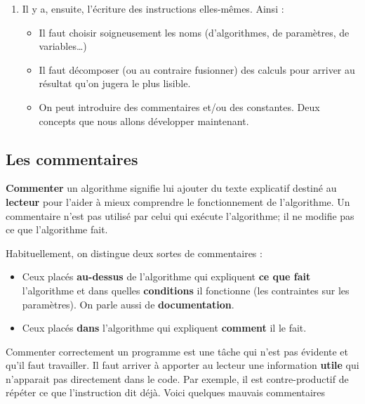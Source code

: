 \begin{enumerate}
		\item
			Il y a, ensuite, l'écriture des instructions elles-mêmes.
			Ainsi :
			\begin{itemize}
			\item
				Il faut choisir soigneusement les noms 
				(d'algorithmes, de paramètres, de variables\dots)
			\item
				Il faut décomposer (ou au contraire fusionner)
				des calculs pour arriver au résultat qu'on jugera
				le plus lisible.
			\item 
				On peut introduire des commentaires et/ou
				des constantes. 
				Deux concepts que nous allons développer maintenant.
			\end{itemize}
			
		\end{enumerate}
				
		\subsection{Les commentaires}
	
			\textbf{Commenter} un algorithme
			signifie lui ajouter du texte explicatif
			destiné au \textbf{lecteur} pour l'aider à mieux
			comprendre le fonctionnement de l'algorithme.
			Un commentaire n'est pas utilisé par celui qui exécute
			l'algorithme; il ne modifie pas ce que l'algorithme fait.
			
			Habituellement, on distingue deux sortes de commentaires :
			\begin{itemize}
			\item
				Ceux placés \textbf{au-dessus} de l'algorithme
				qui expliquent \textbf{ce que fait} l'algorithme
				et dans quelles \textbf{conditions} il fonctionne
				(les contraintes sur les paramètres).
				On parle aussi de \textbf{documentation}.
			\item
				Ceux placés \textbf{dans} l'algorithme
				qui expliquent \textbf{comment} il le fait.
			\end{itemize}
			
			Commenter correctement un programme
			est une tâche qui n'est pas évidente et qu'il faut travailler.
			Il faut arriver à apporter au lecteur
			une information \textbf{utile}
			qui n'apparait pas directement dans le code.
			Par exemple, il est contre-productif de répéter
			ce que l'instruction dit déjà.
			Voici quelques mauvais commentaires
			
